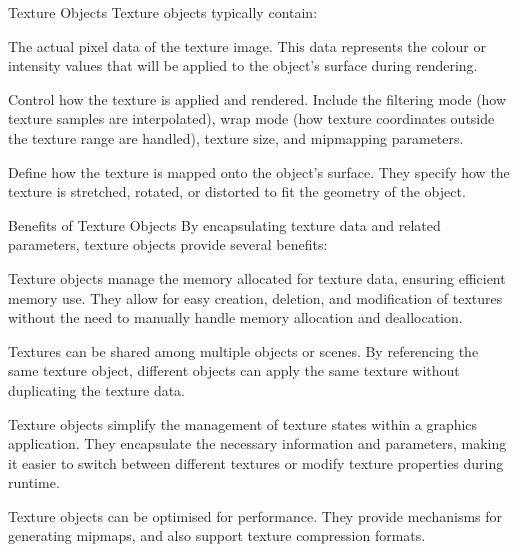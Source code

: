\documentclass[../COS3712_Notes.tex]{subfiles}
\begin{document}
        \begin{sidenote}{Texture Objects}
          Texture objects typically contain:
          \begin{descriptimize}
            \item[Texture Data] The actual pixel data of the texture image.
              This data represents the colour or intensity values that will be applied
              to the object's surface during rendering.
            \item[Texture Parameters] Control how the texture is applied and rendered.
              Include the filtering mode (how texture samples are interpolated),
              wrap mode (how texture coordinates outside the texture range are handled),
              texture size, and mipmapping parameters.
            \item[Texture Coordinates] Define how the texture is mapped onto the object's surface.
              They specify how the texture is stretched, rotated, or distorted to fit the
              geometry of the object.
          \end{descriptimize}
        \end{sidenote}

        \begin{sidenote}{Benefits of Texture Objects}
          By encapsulating texture data and related parameters, texture objects provide several
          benefits:
          \begin{descriptimize}[nosep]
            \item[Efficient Memory Management] Texture objects manage the memory allocated
              for texture data, ensuring efficient memory use.
              They allow for easy creation, deletion, and modification of textures without
              the need to manually handle memory allocation and deallocation.
            \item[Reusability] Textures can be shared among multiple objects or scenes.
              By referencing the same texture object, different objects can apply the same texture
              without duplicating the texture data.
            \item[Texture State Management] Texture objects simplify the management of texture
              states within a graphics application.
              They encapsulate the necessary information and parameters, making it easier to
              switch between different textures or modify texture properties during runtime.
            \item[Performance Optimisation] Texture objects can be optimised for performance.
              They provide mechanisms for generating mipmaps, and also support texture
              compression formats.
          \end{descriptimize}
        \end{sidenote}
\end{document}
